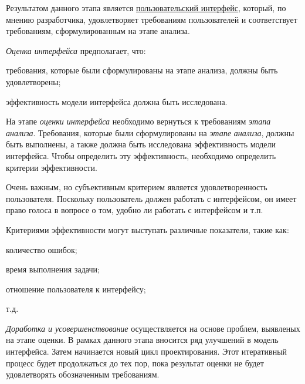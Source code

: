 Результатом данного этапа является \uline{пользовательский интерфейс}, который, по мнению разработчика, удовлетворяет требованиям пользователей и соответствует требованиям, сформулированным на этапе анализа.

\textit{Оценка интерфейса} предполагает, что:
\begin{textitemize}
	\item требования, которые были сформулированы на этапе анализа, должны быть удовлетворены;
	\item эффективность модели интерфейса должна быть исследована.
\end{textitemize}

На этапе \textit{оценки интерфейса} необходимо вернуться к требованиям \textit{этапа анализа}. Требования, которые
были сформулированы на \textit{этапе анализа}, должны быть выполнены, а также должна быть исследована эффективность модели интерфейса.
Чтобы определить эту эффективность, необходимо определить критерии эффективности.

Очень важным, но субъективным критерием является удовлетворенность пользователя. Поскольку пользователь должен работать с интерфейсом, он имеет право голоса в вопросе о том, удобно ли работать с интерфейсом и т.п.

Критериями эффективности могут выступать различные показатели, такие как:
\begin{textitemize}
	\item количество ошибок;
	\item время выполнения задачи;
	\item отношение пользователя к интерфейсу;
	\item т.д.
\end{textitemize}

\textit{Доработка и усовершенствование} осуществляется на основе проблем, выявленых на этапе оценки. В рамках данного этапа вносится ряд улучшений в модель интерфейса. Затем начинается новый цикл проектирования. Этот итеративный процесс будет продолжаться до тех пор, пока результат оценки не будет удовлетворять обозначенным требованиям. 

